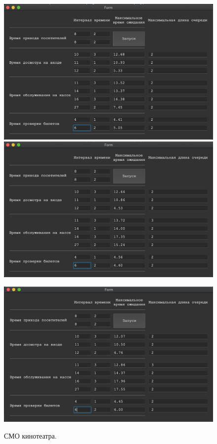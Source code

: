 \documentclass[a4paper,12pt]{article}
\begin{document}
	\begin{figure}[h!]
		\begin{minipage}[b]{0.48\textwidth}
			\includegraphics[width=\textwidth]{1.png}
		\end{minipage}
		\begin{minipage}[b]{0.48\textwidth}
			\includegraphics[width=\textwidth]{2.png}
		\end{minipage}
		\label{ris:smo1}
	\end{figure}

	\begin{figure}[h!]
		\begin{center}
			{\includegraphics[scale = 0.4]{3.png}}
			\label{ris:smo2}
		\end{center}
		\caption{СМО кинотеатра.}
	\end{figure}
\end{document}
